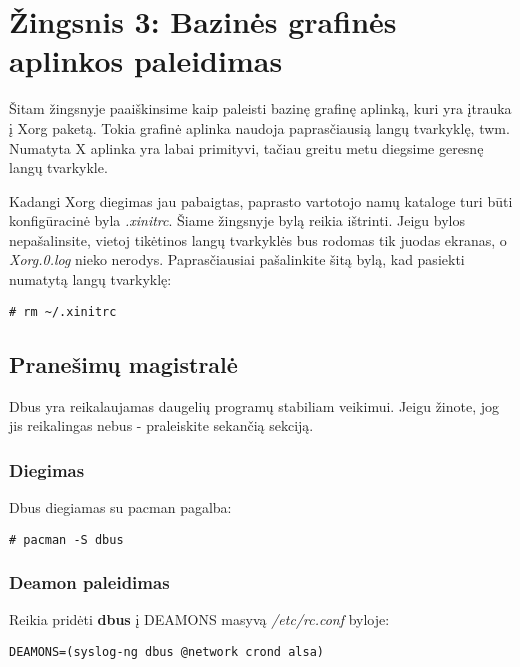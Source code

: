   \section{Žingsnis 3: Bazinės grafinės aplinkos paleidimas}

    Šitam žingsnyje paaiškinsime kaip paleisti bazinę grafinę aplinką,
    kuri yra įtrauka į Xorg paketą. Tokia grafinė aplinka naudoja
    paprasčiausią langų tvarkyklę, twm. Numatyta X aplinka yra labai
    primityvi, tačiau greitu metu diegsime geresnę langų tvarkykle.

    Kadangi Xorg diegimas jau pabaigtas, paprasto vartotojo namų
    kataloge turi būti konfigūracinė byla \textsl{.xinitrc}. Šiame
    žingsnyje bylą reikia ištrinti. Jeigu bylos nepašalinsite, vietoj
    tikėtinos langų tvarkyklės bus rodomas tik juodas ekranas, o
    \textsl{Xorg.0.log} nieko nerodys. Paprasčiausiai pašalinkite šitą
    bylą, kad pasiekti numatytą langų tvarkyklę:

    \begin{verbatim}
# rm ~/.xinitrc
    \end{verbatim}

    \subsection{Pranešimų magistralė}

      Dbus yra reikalaujamas daugelių programų stabiliam
      veikimui. Jeigu žinote, jog jis reikalingas nebus - praleiskite
      sekančią sekciją.

      \subsubsection{Diegimas}

        Dbus diegiamas su pacman pagalba:

        \begin{verbatim}
# pacman -S dbus
        \end{verbatim}

      \subsubsection{Deamon paleidimas}

      Reikia pridėti \textbf{dbus} į DEAMONS masyvą
      \textsl{/etc/rc.conf} byloje:

      \begin{verbatim}
DEAMONS=(syslog-ng dbus @network crond alsa)
      \end{verbatim}
      
